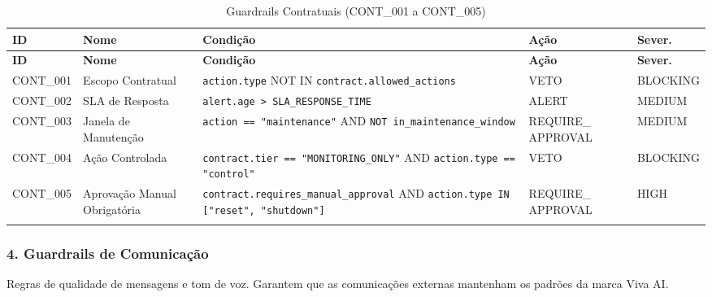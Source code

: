 \documentclass[12pt, a4paper]{article}
\begin{document}
{\small
\begin{longtable}{|p{2cm}|p{2.8cm}|p{5.5cm}|p{2cm}|p{2cm}|}
\hline
\textbf{ID} & \textbf{Nome} & \textbf{Condição} & \textbf{Ação} & \textbf{Sever.} \\ \hline
\endfirsthead
\hline
\textbf{ID} & \textbf{Nome} & \textbf{Condição} & \textbf{Ação} & \textbf{Sever.} \\ \hline
\endhead

CONT\_001 & Escopo Contratual & \texttt{action.type} NOT IN \texttt{contract.allowed\_actions} & VETO & BLOCKING \\ \hline

CONT\_002 & SLA de Resposta & \texttt{alert.age > SLA\_RESPONSE\_TIME} & ALERT & MEDIUM \\ \hline

CONT\_003 & Janela de Manutenção & \texttt{action == "maintenance"} AND \texttt{NOT in\_maintenance\_window} & REQUIRE\_ APPROVAL & MEDIUM \\ \hline

CONT\_004 & Ação Controlada & \texttt{contract.tier == "MONITORING\_ONLY"} AND \texttt{action.type == "control"} & VETO & BLOCKING \\ \hline

CONT\_005 & Aprovação Manual Obrigatória & \texttt{contract.requires\_manual\_approval} AND \texttt{action.type IN ["reset", "shutdown"]} & REQUIRE\_ APPROVAL & HIGH \\ \hline

\caption{Guardrails Contratuais (CONT\_001 a CONT\_005)}
\end{longtable}
}

\subsubsection{4. Guardrails de Comunicação}

Regras de qualidade de mensagens e tom de voz. Garantem que as comunicações externas mantenham os padrões da marca Viva AI.
\end{document}
